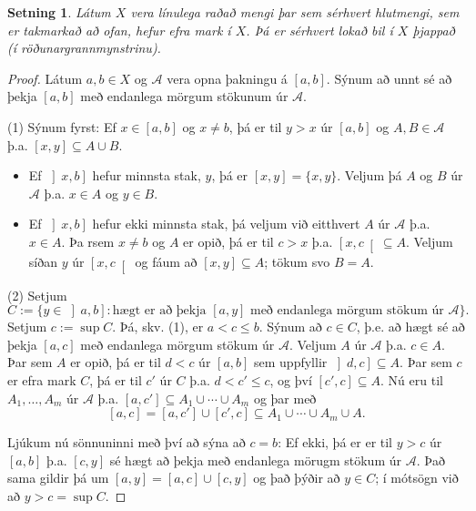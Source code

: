 \documentclass[a4paper,icelandic]{book}
\theoremstyle{definition}
\theoremstyle{plain}
\newtheorem{setn}{Setning}[section]
\theoremstyle{remark}
\begin{document}
\begin{setn}
  Látum $X$ vera línulega raðað mengi þar sem sérhvert hlutmengi, sem
  er takmarkað að ofan, hefur efra mark í $X$. Þá er sérhvert lokað
  bil í $X$ þjappað (í röðunargrannmynstrinu).
\end{setn}
\begin{proof}
  Látum $a,b\in X$ og $\mathcal A$ vera opna þakningu á
  $\left[a,b\right]$. Sýnum að unnt sé að þekja $\left[a,b\right]$ með
  endanlega mörgum stökunum úr $\mathcal A$.

  (1) Sýnum fyrst: Ef $x\in\left[a,b\right]$ og $x\neq b$, þá er til
  $y>x$ úr $\left[a,b\right]$ og $A,B\in\mathcal A$
  þ.a. $\left[x,y\right]\subseteq A\cup B$.
  \begin{itemize}
  \item Ef $\left]x,b\right]$ hefur minnsta stak, $y$, þá er
    $\left[x,y\right] =\{x,y\}$. Veljum þá $A$ og $B$ úr $\mathcal A$
    þ.a. $x\in A$ og $y\in B$.
  \item Ef $\left]x,b\right]$ hefur ekki minnsta stak, þá veljum við
    eitthvert $A$ úr $\mathcal A$ þ.a. $x\in A$. Þa rsem $x\neq b$ og
    $A$ er opið, þá er til $c>x$ þ.a. $\left[x,c\right[\subseteq
    A$. Veljum síðan $y$ úr $\left[x,c\right[$ og fáum að
    $\left[x,y\right]\subseteq A$; tökum svo $B = A$.
  \end{itemize}

  (2) Setjum \[
  C := \{ y\in \left]a,b\right] : \text{hægt er að þekja
    $\left[a,y\right]$ með endanlega mörgum stökum úr $\mathcal A$}\}.
  \]
  Setjum $c := \sup C$. Þá, skv. (1), er $a<c\leq b$. Sýnum að $c\in
  C$, þ.e. að hægt sé að þekja $\left[a,c\right]$ með endanlega mörgum
  stökum úr $\mathcal A$. Veljum $A$ úr $\mathcal A$ þ.a. $c\in
  A$. Þar sem $A$ er opið, þá er til $d<c$ úr $\left[a,b\right]$ sem
  uppfyllir $\left]d,c\right]\subseteq A$. Þar sem $c$ er efra mark
  $C$, þá er til $c'$ úr $C$ þ.a. $d < c'\leq c$, og því
  $\left[c',c\right]\subseteq A$. Nú eru til $A_1,\dots,A_m$ úr
  $\mathcal A$ þ.a. $\left[a,c'\right]\subseteq A_1\cup \cdots\cup
  A_m$ og þar með \[ \left[a,c\right] =
  \left[a,c'\right]\cup\left[c',c\right]\subseteq A_1\cup\cdots\cup
  A_m\cup A.\]

  Ljúkum nú sönnuninni með því að sýna að $c = b$: Ef ekki, þá er er
  til $y>c$ úr $\left[a,b\right]$  þ.a. $\left[c,y\right]$ sé hægt að
  þekja með endanlega mörugm stökum úr $\mathcal A$. Það sama gildir
  þá um $\left[a,y\right] = \left[a,c\right]\cup\left[c,y\right]$ og
  það þýðir að $y\in C$; í mótsögn við að $y>c =\sup C$.
\end{proof}
\end{document}
